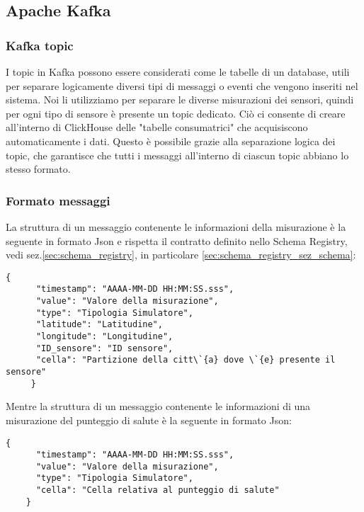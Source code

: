 \subsection{Apache Kafka}
\subsubsection{Kafka topic}
I topic in Kafka possono essere considerati come le tabelle di un database, utili per separare logicamente diversi tipi di messaggi o eventi che vengono inseriti nel sistema. Noi li utilizziamo per separare le diverse misurazioni dei sensori, quindi per ogni tipo di sensore è presente un topic dedicato. Ciò ci consente di creare all'interno di ClickHouse delle "tabelle consumatrici" che acquisiscono automaticamente i dati. Questo è possibile grazie alla separazione logica dei topic, che garantisce che tutti i messaggi all'interno di ciascun topic abbiano lo stesso formato.
\subsubsection{Formato messaggi} \label{sec:formatoMessaggi}
La struttura di un messaggio contenente le informazioni della misurazione è la seguente in formato Json e rispetta il contratto definito nello Schema Registry, vedi sez.\ref{sec:schema_registry}, in particolare \ref{sec:schema_registry_sez_schema}:
\begin{lstlisting}[style=code]
    {
      "timestamp": "AAAA-MM-DD HH:MM:SS.sss", 
      "value": "Valore della misurazione",  
      "type": "Tipologia Simulatore",
      "latitude": "Latitudine",
      "longitude": "Longitudine",
      "ID_sensore": "ID sensore",
      "cella": "Partizione della citt\`{a} dove \`{e} presente il sensore" 
     }
\end{lstlisting}
Mentre la struttura di un messaggio contenente le informazioni di una misurazione del punteggio di salute è la seguente in formato Json:
\begin{lstlisting}[style=code]
    {
      "timestamp": "AAAA-MM-DD HH:MM:SS.sss", 
      "value": "Valore della misurazione",  
      "type": "Tipologia Simulatore",
      "cella": "Cella relativa al punteggio di salute"
    }
\end{lstlisting}


